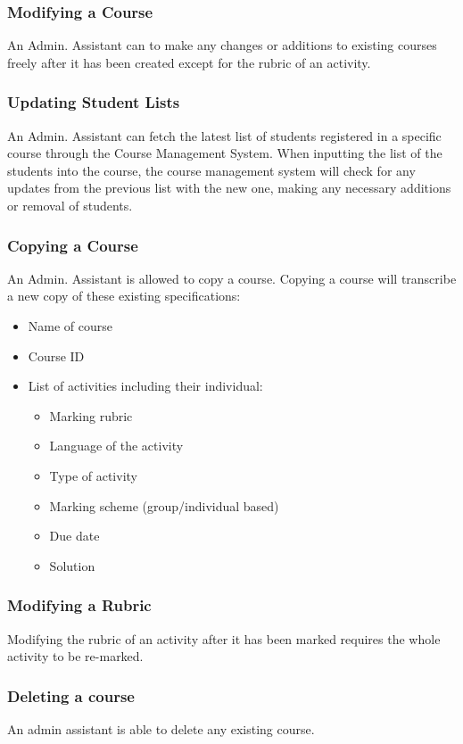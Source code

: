 \documentclass{article}
\begin{document}
\subsubsection{Modifying a Course}
An Admin. Assistant can to make any changes or additions to existing courses
freely after it has been created except for the rubric of an activity.
\subsubsection{Updating Student Lists}
An Admin. Assistant can fetch the latest list of students registered in a
specific course through the Course Management System.
When inputting the list of the students into the course, the course management
system will check for any updates from the previous list with the new one,
making any necessary additions or removal of students.
\subsubsection{Copying a Course}
An Admin. Assistant is allowed to copy a course. Copying a course will transcribe a new copy of these existing specifications:
\begin{itemize}
  \item Name of course
  \item Course ID
  \item List of activities including their individual:
    \begin{itemize}
    \item Marking rubric
    \item Language of the activity
    \item Type of activity
    \item Marking scheme (group/individual based)
    \item Due date
    \item Solution
    \end {itemize}
\end {itemize}
\subsubsection{Modifying a Rubric}
Modifying the rubric of an activity after it has been marked requires the whole
activity to be re-marked.
\subsubsection{Deleting a course}
An admin assistant is able to delete any existing course.
\end{document}
